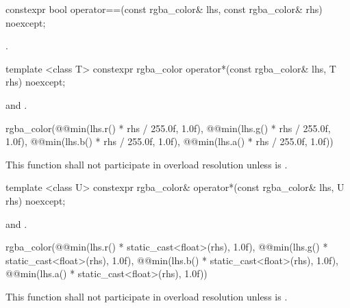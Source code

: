 %
\begin{itemdecl}
constexpr bool operator==(const rgba_color& lhs, const rgba_color& rhs) 
  noexcept;
\end{itemdecl}
\begin{itemdescr}
\pnum
\returns
{}.
\end{itemdescr}

%
\begin{itemdecl}
template <class T>
constexpr rgba_color operator*(const rgba_color& lhs, T rhs) noexcept;
\end{itemdecl}
\begin{itemdescr}
\pnum
\requires
{} and .

\pnum
\returns
\begin{codeblock}
rgba_color(@\stdqualifier{}@min(lhs.r() * rhs / 255.0f, 1.0f), 
  @\stdqualifier{}@min(lhs.g() * rhs / 255.0f, 1.0f),
  @\stdqualifier{}@min(lhs.b() * rhs / 255.0f, 1.0f), 
  @\stdqualifier{}@min(lhs.a() * rhs / 255.0f, 1.0f))
\end{codeblock}

\pnum
\remarks
This function shall not participate in overload resolution unless  is .
\end{itemdescr}

%
\begin{itemdecl}
template <class U>
constexpr rgba_color& operator*(const rgba_color& lhs, U rhs) noexcept;
\end{itemdecl}
\begin{itemdescr}
\pnum
\requires
{} and .

\pnum
\returns
\begin{codeblock}
rgba_color(@\stdqualifier{}@min(lhs.r() * static_cast<float>(rhs), 1.0f), 
  @\stdqualifier{}@min(lhs.g() * static_cast<float>(rhs), 1.0f),
  @\stdqualifier{}@min(lhs.b() * static_cast<float>(rhs), 1.0f),
  @\stdqualifier{}@min(lhs.a() * static_cast<float>(rhs), 1.0f))
\end{codeblock}

\pnum
\remarks
This function shall not participate in overload resolution unless  is .
\end{itemdescr}

